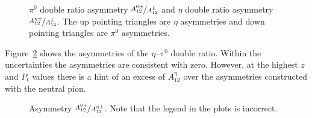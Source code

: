 \begin{figure}[t]
  \centering     
  \caption[Comparison of $\pi^{0}$ and $\eta$ double-ratio asymmetries] {$\pi^0$ double ratio asymmetry $\nicefrac{A^{0\pm}_{12}}{A^L_{12}}$ and $\eta$ double ratio asymmetry $\nicefrac{A^{\eta\pm}_{12}}{A^L_{12}}$. The up pointing triangles are $\eta$ asymmetries and down pointing triangles are $\pi^0$ asymmetries.}
  \label{fig:exp_pi0_eta_result}
\end{figure}
Figure~\ref{fig:exp_pi0_eta_ratio} shows the asymmetries of the $\eta$--$\pi^0$ double ratio. Within the uncertainties the asymmetries are consistent with zero. However, at the highest $z$ and $P_t$ values there is a hint of an excess of $A_{12}^\eta$ over the asymmetries constructed with the neutral pion.
\begin{figure}[H]
  \centering     
  \caption[Asymmetry $\nicefrac{A^{0\pm}_{12}}{A^{\eta\pm}_{12}}$]{Asymmetry $\nicefrac{A^{0\pm}_{12}}{A^{\eta\pm}_{12}}$. Note that the legend in the plots is incorrect.}
  \label{fig:exp_pi0_eta_ratio}
\end{figure}
